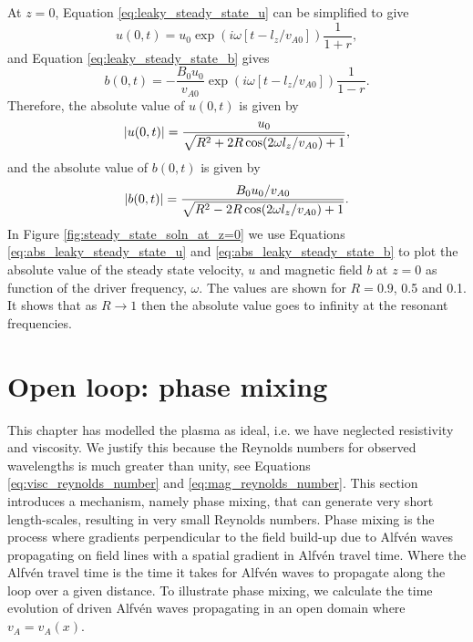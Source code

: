 At $z=0$, Equation \eqref{eq:leaky_steady_state_u} can be simplified to give
\begin{equation}
    \label{eq:leaky_steady_state_u_z=0}
    u(0,t) = u_0\exp(i\omega[t - l_z/v_{A0}])\frac{1}{1+r},
\end{equation}
and Equation \eqref{eq:leaky_steady_state_b} gives
\begin{equation}
    \label{eq:leaky_steady_state_b_z=0}
    b(0,t) = -\frac{B_0u_0}{v_{A0}}\exp(i\omega[t - l_z/v_{A0}])\frac{1}{1-r}.
\end{equation}
Therefore, the absolute value of $u(0,t)$ is given by
\begin{equation}
    \label{eq:abs_leaky_steady_state_u}
    \abs{u(0,t)} = \frac{u_0}{\sqrt{R^2+2R\cos(2\omega l_z / v_{A0})+1}},
\end{equation}
and the absolute value of $b(0,t)$ is given by
\begin{equation}
    \label{eq:abs_leaky_steady_state_b}
    \abs{b(0,t)} = \frac{B_0 u_0 / v_{A0}}{\sqrt{R^2-2R\cos(2\omega l_z / v_{A0})+1}}.
\end{equation}
In Figure \ref{fig:steady_state_soln_at_z=0} we use Equations \eqref{eq:abs_leaky_steady_state_u} and \eqref{eq:abs_leaky_steady_state_b} to plot the absolute value of the steady state  velocity, $u$ and magnetic field $b$ at $z=0$ as function of the driver frequency, $\omega$. The values are shown for $R=0.9$, 0.5 and 0.1. It shows that as $R\rightarrow 1$ then the absolute value goes to infinity at the resonant frequencies.

\section{Open loop: phase mixing}
\label{sec:phase_mixing}

This chapter has modelled the plasma as ideal, i.e. we have neglected resistivity and viscosity. We justify this because the Reynolds numbers for observed wavelengths is much greater than unity, see Equations \eqref{eq:visc_reynolds_number} and \eqref{eq:mag_reynolds_number}. This section introduces a mechanism, namely phase mixing, that can generate very short length-scales, resulting in very small Reynolds numbers. Phase mixing is the process where gradients perpendicular to the field build-up due to Alfv\'en waves propagating on field lines with a spatial gradient in Alfvén travel time. Where the Alfv\'en travel time is the time it takes for Alfv\'en waves to propagate along the loop over a given distance. To illustrate phase mixing, we calculate the time evolution of driven Alfv\'en waves propagating in an open domain where $v_A=v_A(x)$.

